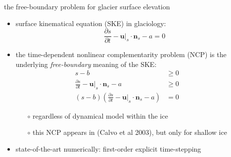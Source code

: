 \documentclass[10pt,dvipsnames]{beamer}
\theoremstyle{theorem}
\newcommand{\bn}{\mathbf{n}}
\newcommand{\bu}{\mathbf{u}}
\begin{document}
\begin{frame}{the free-boundary problem for glacier surface elevation}

\begin{itemize}
\item surface kinematical equation (SKE) in glaciology:
   $$\frac{\partial s}{\partial t} - \bu|_s \cdot \bn_s - a = 0$$
\item the time-dependent nonlinear complementarity problem (NCP) is the underlying \emph{free-boundary} meaning of the SKE:
\begin{align*}
s - b &\ge 0 &&\phantom{x} \\
\frac{\partial s}{\partial t} - \bu|_s \cdot \bn_s - a &\ge 0 \\
(s - b) \left(\frac{\partial s}{\partial t} - \bu|_s \cdot \bn_s - a\right) &= 0
\end{align*}

    \begin{itemize}
    \item[$\circ$] regardless of dynamical model within the ice
    \item[$\circ$] this NCP appears in (Calvo et al 2003), but only for shallow ice
    \end{itemize}
\item state-of-the-art numerically: first-order explicit time-stepping
\end{itemize}
\end{frame}
\end{document}

